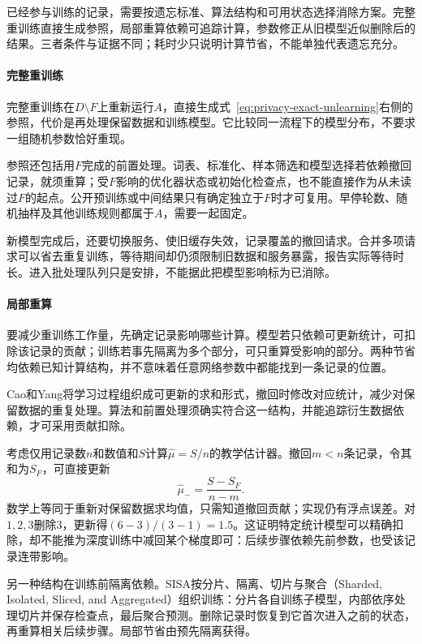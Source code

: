 已经参与训练的记录，需要按遗忘标准、算法结构和可用状态选择消除方案。完整重训练直接生成参照，局部重算依赖可追踪计算，参数修正从旧模型近似删除后的结果。三者条件与证据不同；耗时少只说明计算节省，不能单独代表遗忘充分。

\paragraph{完整重训练}

完整重训练在$D\setminus F$上重新运行$A$，直接生成式~\eqref{eq:privacy-exact-unlearning}右侧的参照，代价是再处理保留数据和训练模型。它比较同一流程下的模型分布，不要求一组随机参数恰好重现。

参照还包括用$F$完成的前置处理。词表、标准化、样本筛选和模型选择若依赖撤回记录，就须重算；受$F$影响的优化器状态或初始化检查点，也不能直接作为从未读过$F$的起点。公开预训练或中间结果只有确定独立于$F$时才可复用。早停轮数、随机抽样及其他训练规则都属于$A$，需要一起固定。

新模型完成后，还要切换服务、使旧缓存失效，记录覆盖的撤回请求。合并多项请求可以省去重复训练，等待期间却仍须限制旧数据和服务暴露，报告实际等待时长。进入批处理队列只是安排，不能据此把模型影响标为已消除。

\paragraph{局部重算}

要减少重训练工作量，先确定记录影响哪些计算。模型若只依赖可更新统计，可扣除该记录的贡献；训练若事先隔离为多个部分，可只重算受影响的部分。两种节省均依赖已知计算结构，并不意味着任意网络参数中都能找到一条记录的位置。

Cao和Yang将学习过程组织成可更新的求和形式，撤回时修改对应统计，减少对保留数据的重复处理。算法和前置处理须确实符合这一结构，并能追踪衍生数据依赖，才可采用贡献扣除。

考虑仅用记录数$n$和数值和$S$计算$\hat\mu=S/n$的教学估计器。撤回$m<n$条记录，令其和为$S_F$，可直接更新
\[
 \hat\mu_- =\frac{S-S_F}{n-m}.
\]
数学上等同于重新对保留数据求均值，只需知道撤回贡献；实现仍有浮点误差。对$1,2,3$删除3，更新得$(6-3)/(3-1)=1.5$。这证明特定统计模型可以精确扣除，却不能推为深度训练中减回某个梯度即可：后续步骤依赖先前参数，也受该记录连带影响。

另一种结构在训练前隔离依赖。SISA按分片、隔离、切片与聚合（Sharded, Isolated, Sliced, and Aggregated）组织训练：分片各自训练子模型，内部依序处理切片并保存检查点，最后聚合预测。删除记录时恢复到它首次进入之前的状态，再重算相关后续步骤。局部节省由预先隔离获得。

